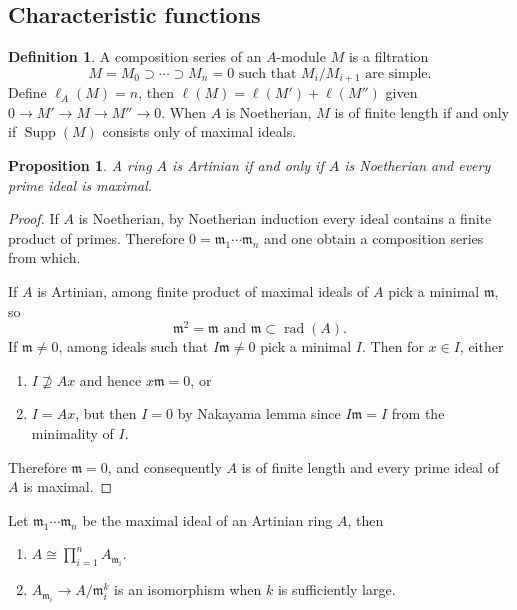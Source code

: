 \documentclass[leqno]{amsart}
\DeclareMathOperator{\rad}{rad}
\DeclareMathOperator{\Supp}{Supp}
\newcommand{\1}{\mathbf{1}}
\newcommand{\fm}{\mathfrak m}
\newtheorem{prop}[thm]{Proposition}
\theoremstyle{definition}
\newtheorem{defn}[thm]{Definition}
\theoremstyle{remark}
\begin{document}
\subsection{Characteristic functions}
\begin{defn}
	A composition series of an $A$-module $M$ is a filtration
	\[
		M=M_0\supset \cdots \supset M_n=0
		\text{ such that } M_i/M_{i+1} \text{ are simple.}
	\]
	Define $\ell_A(M)=n$, then
	$\ell(M)=\ell(M')+\ell(M'')$ given
	$0\to M'\to M\to M''\to 0$.
	When $A$ is Noetherian, $M$ is of finite length
	if and only if $\Supp(M)$ consists only of maximal ideals.
\end{defn}
\begin{prop}
	A ring $A$ is Artinian if and only if 
	$A$ is Noetherian and every prime ideal is maximal.
\end{prop}
\begin{proof}
	If $A$ is Noetherian, by Noetherian induction 
	every ideal contains a finite product of primes.
	Therefore $0=\fm_1\cdots \fm_n$ and one obtain
	a composition series from which.

	If $A$ is Artinian,
	among finite product of maximal ideals of $A$ 
	pick a minimal $\fm$, so
	\[
		\fm^2=\fm \text{ and } \fm\subset \rad(A).
	\]
	If $\fm\neq 0$, 
	among ideals such that $I\fm\neq 0$ 
	pick a minimal  $I$.
	Then for $x\in I$, either
	\begin{enumerate}
		\item $I\nsupseteq Ax$ and hence $x\fm=0$, or 
		\item  $I=Ax$, but then $I=0$ by Nakayama lemma
			since $I\fm=I$ from the minimality of $I$.
	\end{enumerate}
	Therefore $\fm=0$, and consequently
	$A$ is of finite length and every prime ideal
	of $A$ is maximal.
\end{proof}
Let $\fm_1\cdots \fm_n$ be the maximal ideal of an Artinian ring $A$,
then 
\begin{enumerate}[label=(\alph*)]
	\item $A\cong \prod_{i=1}^{n}A_{\fm_i}$.
	\item $A_{\fm_i}\to A/\fm_i^{k}$ is an isomorphism when
		$k$ is sufficiently large.
\end{enumerate}
\end{document}

